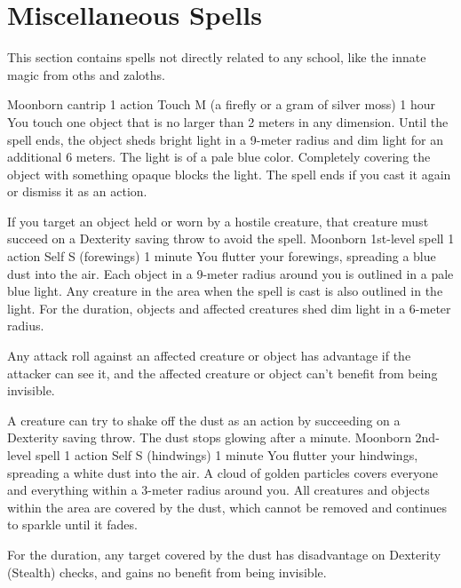 \section{Miscellaneous Spells}
This section contains spells not directly related to any school, like the innate magic from oths and zaloths.

    {Moonborn cantrip}
    {1 action}
    {Touch}
    {M (a firefly or a gram of silver moss)}
    {1 hour}
    You touch one object that is no larger than 2 meters in any dimension.
    Until the spell ends, the object sheds bright light in a 9-meter radius and dim light for an additional 6 meters.
    The light is of a pale blue color.
    Completely covering the object with something opaque blocks the light.
    The spell ends if you cast it again or dismiss it as an action.

    If you target an object held or worn by a hostile creature, that creature must succeed on a Dexterity saving throw to avoid the spell.
    {Moonborn 1st-level spell}
    {1 action}
    {Self}
    {S (forewings)}
    {1 minute}
    You flutter your forewings, spreading a blue dust into the air.
    Each object in a 9-meter radius around you is outlined in a pale blue light.
    Any creature in the area when the spell is cast is also outlined in the light.
    For the duration, objects and affected creatures shed dim light in a 6-meter radius.

    Any attack roll against an affected creature or object has advantage if the attacker can see it, and the affected creature or object can't benefit from being invisible.

    A creature can try to shake off the dust as an action by succeeding on a Dexterity saving throw.
    The dust stops glowing after a minute.
    {Moonborn 2nd-level spell}
    {1 action}
    {Self}
    {S (hindwings)}
    {1 minute}
    You flutter your hindwings, spreading a white dust into the air.
    A cloud of golden particles covers everyone and everything within a 3-meter radius around you.
    All creatures and objects within the area are covered by the dust, which cannot be removed and continues to sparkle until it fades.

    For the duration, any target covered by the dust has disadvantage on Dexterity (Stealth) checks, and gains no benefit from being invisible.


